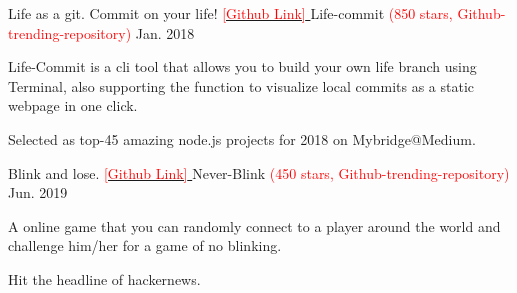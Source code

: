 

\begin{cventries}

  \cventry
    {Life as a git. Commit on your life! \href{https://github.com/ByronHsu/life-commit}{ \textcolor{red}{[Github Link]} }} %
    {Life-commit \textcolor{red}{(850 stars, Github-trending-repository)}} %
    {} %
    {Jan. 2018} %
    {
      \begin{cvitems} %
        \item {Life-Commit is a cli tool that allows you to build your own life branch using Terminal, also supporting the function to visualize local commits as a static webpage in one click.}
        \item {Selected as top-45 amazing node.js projects for 2018 on Mybridge@Medium.}
      \end{cvitems}
    }


  \cventry
    {Blink and lose. \href{https://github.com/ByronHsu/Never-Blink}{ \textcolor{red}{[Github Link]} }} %
    {Never-Blink \textcolor{red}{(450 stars, Github-trending-repository)}} %
    {} %
    {Jun. 2019} %
    {
      \begin{cvitems} %
        \item {A online game that you can randomly connect to a player around the world and challenge him/her for a game of no blinking.}
        \item {Hit the headline of hackernews.}
      \end{cvitems}
    }



\end{cventries}
